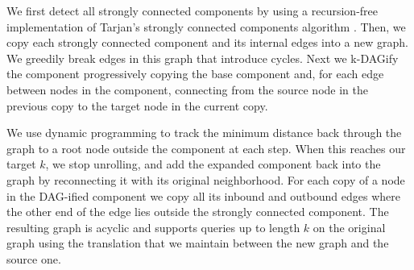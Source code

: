 We first detect all strongly connected components by using a recursion-free implementation of Tarjan's strongly connected components algorithm \cite{tarjan1972depth}.
Then, we copy each strongly connected component and its internal edges into a new graph.
We greedily break edges in this graph that introduce cycles.
Next we k-DAGify the component progressively copying the base component and, for each edge between nodes in the component, connecting from the source node in the previous copy to the target node in the current copy.

We use dynamic programming to track the minimum distance back through the graph to a root node outside the component at each step.
When this reaches our target $k$, we stop unrolling, and add the expanded component back into the graph by reconnecting it with its original neighborhood.
For each copy of a node in the DAG-ified component we copy all its inbound and outbound edges where the other end of the edge lies outside the strongly connected component.
The resulting graph is acyclic and supports queries up to length $k$ on the original graph using the translation that we maintain between the new graph and the source one.

